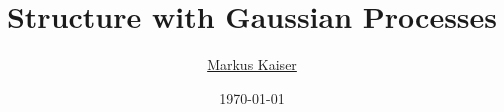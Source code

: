 \title{Structure with Gaussian Processes}
\author{\href{mailto:markus@zfix.org}{Markus Kaiser}}
\date{\today}

\renewcommand\maketitle{
    \begin{titlepage}%
    \end{titlepage}%
}
